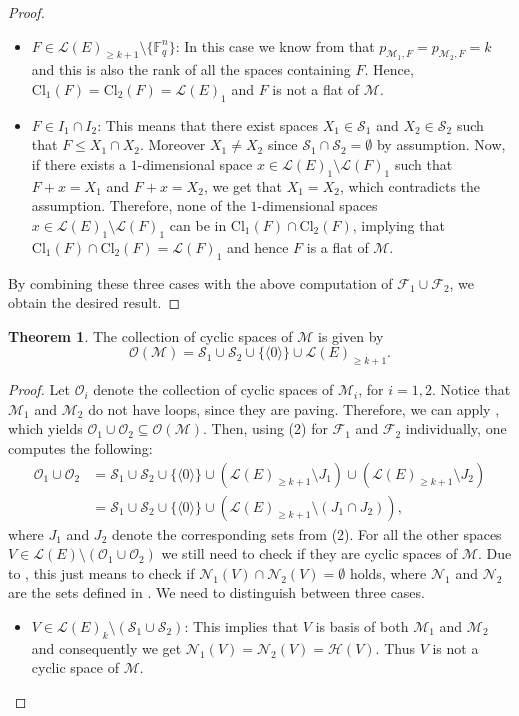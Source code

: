 \documentclass[a4paper,11pt,reqno]{amsart}
\theoremstyle{definition}
\newtheorem{theorem}{Theorem}[section]
\newcommand{\mM}{\mathcal{M}}
\newcommand{\mL}{\mathcal{L}}
\newcommand{\mF}{\mathcal{F}}
\newcommand{\mO}{\mathcal{O}}
\newcommand{\mS}{\mathcal{S}}
\newcommand{\mN}{\mathcal{N}}
\newcommand{\mH}{\mathcal{H}}
\newcommand{\F}{\mathbb F}
\begin{document}
{\begin{proof}
\begin{itemize}
        \item $F\in\mL(E)_{\geq k+1}\setminus\{\F_q^n\}$: In this case we know from  that $p_{\mM_1,F}=p_{\mM_2,F}=k$ and  this is also the rank of all the spaces containing $F$. Hence, $\text{Cl}_1(F)=\text{Cl}_2(F)=\mL(E)_1$ and $F$ is not a flat of $\mM$.

        \item $F\in I_1\cap I_2$: This means that there exist spaces $X_1\in\mS_1$ and $X_2\in\mS_2$ such that $F\leq X_1\cap X_2$. Moreover $X_1\not=X_2$ since $\mS_1\cap\mS_2=\emptyset$ by assumption. Now, if there exists a $1$-dimensional space $x\in\mL(E)_1\setminus\mL(F)_1$ such that $F+x=X_1$ and $F+x=X_2$, we get that $X_1=X_2$, which contradicts the assumption. Therefore, none of the $1$-dimensional spaces $x\in\mL(E)_1\setminus\mL(F)_1$ can be in $\text{Cl}_1(F)\cap\text{Cl}_2(F)$, implying that $\text{Cl}_1(F)\cap\text{Cl}_2(F)=\mL(F)_1$ and hence $F$ is a flat of $\mM$.
    \end{itemize}
    By combining these three cases with the above computation of $\mF_1\cup\mF_2$, we obtain the desired result. 
\end{proof}

\begin{theorem}\label{thm: cyclic_paving_conv_comb}
    The collection of cyclic spaces of $\mM$ is given by
    \[
        \mO(\mM)=\mS_1\cup\mS_2\cup\{\langle 0\rangle\}\cup\mL(E)_{\geq k+1}.
    \] 
\end{theorem}
\begin{proof}
Let $\mO_i$ denote the collection of cyclic spaces of $\mM_i$, for $i=1,2$.  Notice that $\mM_1$ and $\mM_2$ do not have loops, since they are paving. Therefore, we can apply , which yields $\mO_1\cup\mO_2\subseteq\mO(\mM)$. Then, using  (2) for $\mF_1$ and $\mF_2$ individually, one computes the following:
    \begin{align*}
        \mO_1\cup\mO_2 &= \mS_1\cup\mS_2\cup\{\langle 0\rangle\}\cup(\mL(E)_{\geq k+1}\setminus J_1)\cup(\mL(E)_{\geq k+1}\setminus J_2)\\
        &= \mS_1\cup\mS_2\cup\{\langle 0\rangle\}\cup(\mL(E)_{\geq k+1}\setminus (J_1\cap J_2)),
    \end{align*}
    where $J_1$ and $J_2$ denote the corresponding sets from  (2). For all the other spaces $V\in\mL(E)\setminus(\mO_1\cup\mO_2)$ we still need to check if they are cyclic spaces of $\mM$. Due to , this just means to check if $\mN_1(V)\cap\mN_2(V)=\emptyset$ holds, where $\mN_1$ and $\mN_2$ are the sets defined in . We need to distinguish between three cases.
    \begin{itemize}
        \item $V\in\mL(E)_k\setminus(\mS_1\cup\mS_2)$: This implies that $V$ is basis of both $\mM_1$ and $\mM_2$ and consequently we get $\mN_1(V)=\mN_2(V)=\mH(V)$. Thus $V$ is not a cyclic space of $\mM$.


\end{itemize}
\end{proof}}
\end{document}

